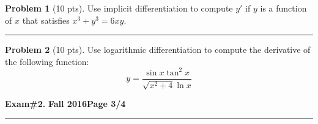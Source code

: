 \documentclass[12pt]{article}
\theoremstyle{definition}
\newtheorem{problem}{Problem}
\begin{document}
\bigskip
\begin{problem}[10 pts]
Use implicit differentiation to compute $y'$ if $y$ is a function of $x$ that satisfies $x^3+y^3=6xy$.
\vspace{8cm}
\begin{flushright}
\end{flushright}
\end{problem}
\hrule
\begin{problem}[10 pts]
Use logarithmic differentiation to compute the derivative of the following function:
\begin{equation*}
y = \frac{\sin x \tan^2 x}{\sqrt{x^2+4} \ln x}
\end{equation*}
\vspace{8cm}
\begin{flushright}
\end{flushright}
\end{problem}
\newpage

\hfill{\large\bf Exam\#2.}\hfill{\large\bf
  Fall 2016}\hfill{\large\bf Page 3/4}\hrule
\end{document}
